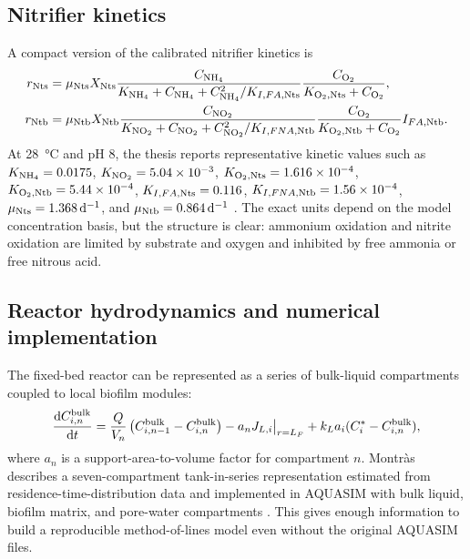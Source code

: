 \documentclass[11pt]{article}
\newcommand{\dd}{\mathrm{d}}
\begin{document}
\subsection{Nitrifier kinetics}

A compact version of the calibrated nitrifier kinetics is
\begin{align}
  r_{\rm Nts} &=\mu_{\rm Nts}X_{\rm Nts}
  \frac{C_{\ce{NH4}}}{K_{\ce{NH4}}+C_{\ce{NH4}}+C_{\ce{NH4}}^2/K_{I,FA,\rm Nts}}
  \frac{C_{\ce{O2}}}{K_{\ce{O2},\rm Nts}+C_{\ce{O2}}},\label{eq:nts_rate}\\
  r_{\rm Ntb} &=\mu_{\rm Ntb}X_{\rm Ntb}
  \frac{C_{\ce{NO2}}}{K_{\ce{NO2}}+C_{\ce{NO2}}+C_{\ce{NO2}}^2/K_{I,FNA,\rm Ntb}}
  \frac{C_{\ce{O2}}}{K_{\ce{O2},\rm Ntb}+C_{\ce{O2}}}I_{FA,\rm Ntb}.
  \label{eq:ntb_rate}
\end{align}
At \SI{28}{\celsius} and pH 8, the thesis reports representative kinetic values such as $K_{\ce{NH4}}=0.0175$, $K_{\ce{NO2}}=5.04\times10^{-3}$, $K_{\ce{O2},\rm Nts}=1.616\times10^{-4}$, $K_{\ce{O2},\rm Ntb}=5.44\times10^{-4}$, $K_{I,FA,\rm Nts}=0.116$, $K_{I,FNA,\rm Ntb}=1.56\times10^{-4}$, $\mu_{\rm Nts}=1.368\,\si{d^{-1}}$, and $\mu_{\rm Ntb}=0.864\,\si{d^{-1}}$ \parencite[112]{montras2009}. The exact units depend on the model concentration basis, but the structure is clear: ammonium oxidation and nitrite oxidation are limited by substrate and oxygen and inhibited by free ammonia or free nitrous acid.

\subsection{Reactor hydrodynamics and numerical implementation}

The fixed-bed reactor can be represented as a series of bulk-liquid compartments coupled to local biofilm modules:
\begin{equation}
  \frac{\dd C_{i,n}^{\rm bulk}}{\dd t}
  =\frac{Q}{V_n}\left(C_{i,n-1}^{\rm bulk}-C_{i,n}^{\rm bulk}\right)
  -a_nJ_{L,i}\big|_{r=L_F}
  +k_La_i(C_i^*-C_{i,n}^{\rm bulk}),
  \label{eq:c3_tanks}
\end{equation}
where $a_n$ is a support-area-to-volume factor for compartment $n$. Montr\`as describes a seven-compartment tank-in-series representation estimated from residence-time-distribution data and implemented in AQUASIM with bulk liquid, biofilm matrix, and pore-water compartments \parencite[105, 114--115]{montras2009}. This gives enough information to build a reproducible method-of-lines model even without the original AQUASIM files.
\end{document}
